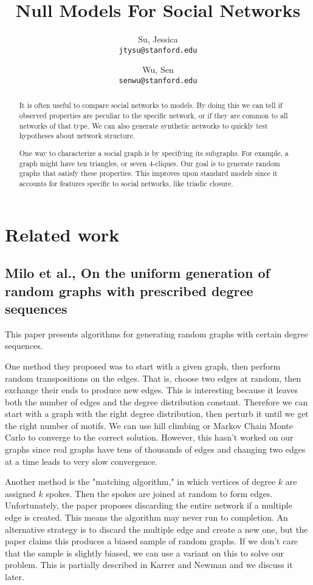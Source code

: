 \documentclass[12pt]{article}
\title{Null Models For Social Networks}
\author{
  Su, Jessica\\
  \texttt{jtysu@stanford.edu}
  \and
  Wu, Sen\\
  \texttt{senwu@stanford.edu}
}
\begin{document}
\maketitle
\begin{abstract}
It is often useful to compare social networks to models.  By doing this we can tell if observed properties are peculiar to the specific network, or if they are common to all networks of that type.  We can also generate synthetic networks to quickly test hypotheses about network structure.

One way to characterize a social graph is by specifying its subgraphs.  For example, a graph might have ten triangles, or seven 4-cliques.  Our goal is to generate random graphs that satisfy these properties.  This improves upon standard models since it accounts for features specific to social networks, like triadic closure.
\end{abstract}

\section{Related work}

\subsection{Milo et al., On the uniform generation of random graphs with prescribed degree sequences \cite{milo}}
This paper presents algorithms for generating random graphs with certain degree sequences.

One method they proposed was to start with a given graph, then perform random transpositions on the edges.  That is, choose two edges at random, then exchange their ends to produce new edges.  This is interesting because it leaves both the number of edges and the degree distribution constant.  Therefore we can start with a graph with the right degree distribution, then perturb it until we get the right number of motifs.  We can use hill climbing or Markov Chain Monte Carlo to converge to the correct solution.  However, this hasn't worked on our graphs since real graphs have tens of thousands of edges and changing two edges at a time leads to very slow convergence.

Another method is the "matching algorithm," in which vertices of degree $k$ are assigned $k$ spokes.  Then the spokes are joined at random to form edges.  Unfortunately, the paper proposes discarding the entire network if a multiple edge is created.  This means the algorithm may never run to completion.  An alternative strategy is to discard the multiple edge and create a new one, but the paper claims this produces a biased sample of random graphs.  If we don't care that the sample is slightly biased, we can use a variant on this to solve our problem.  This is partially described in Karrer and Newman \cite{karrer} and we discuss it later.
\end{document}
